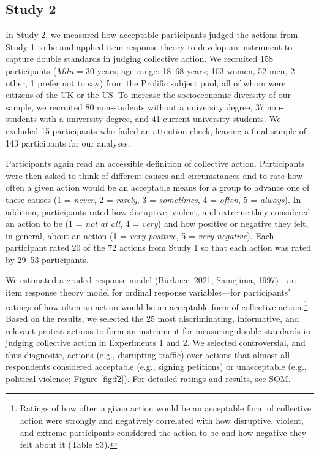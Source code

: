 \documentclass[12pt, letterpaper]{article}
\begin{document}
\hypertarget{study-2}{%
\subsection{Study 2}\label{study-2}}

In Study 2, we measured how acceptable participants judged the actions
from Study 1 to be and applied item response theory to develop an
instrument to capture double standards in judging collective action. We
recruited 158 participants (\(\textit{Mdn} = 30\) years, age range:
18--68 years; 103 women, 52 men, 2 other, 1 prefer not to say) from the
Prolific subject pool, all of whom were citizens of the UK or the US. To
increase the socioeconomic diversity of our sample, we recruited 80
non-students without a university degree, 37 non-students with a
university degree, and 41 current university students. We excluded 15
participants who failed an attention check, leaving a final sample of
143 participants for our analyses.

Participants again read an accessible definition of collective action.
Participants were then asked to think of different causes and
circumstances and to rate how often a given action would be an
acceptable means for a group to advance one of these causes (1 =
\emph{never}, 2 = \emph{rarely}, 3 = \emph{sometimes}, 4 = \emph{often},
5 = \emph{always}). In addition, participants rated how disruptive,
violent, and extreme they considered an action to be (1 = \emph{not at
all}, 4 = \emph{very}) and how positive or negative they felt, in
general, about an action (1 = \emph{very positive}, 5 = \emph{very
negative}). Each participant rated 20 of the 72 actions from Study 1 so
that each action was rated by 29--53 participants.

We estimated a graded response model (Bürkner, 2021; Samejima,
1997)---an item response theory model for ordinal response
variables---for participants' ratings of how often an action would be an
acceptable form of collective action.\footnote{Ratings of how often a
  given action would be an acceptable form of collective action were
  strongly and negatively correlated with how disruptive, violent, and
  extreme participants considered the action to be and how negative they
  felt about it (Table S3).} Based on the results, we selected the 25
most discriminating, informative, and relevant protest actions to form
an instrument for measuring double standards in judging collective
action in Experiments 1 and 2. We selected controversial, and thus
diagnostic, actions (e.g., disrupting traffic) over actions that almost
all respondents considered acceptable (e.g., signing petitions) or
unacceptable (e.g., political violence; Figure \ref{fig:f2}). For
detailed ratings and results, see SOM.
\end{document}

